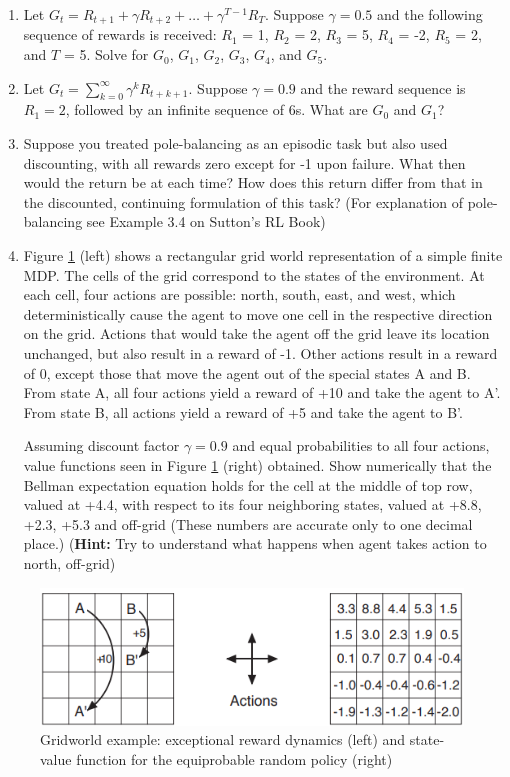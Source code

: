 \documentclass[11pt,onecolumn]{article}
\begin{document}
\begin{enumerate}
    \item Let $G_t = R_{t+1} + \gamma R_{t+2} + \ldots + \gamma^{T-1} R_{T}$. Suppose $\gamma = 0.5$ and the following sequence of rewards is received: $R_1$ = 1, $R_2$ = 2, $R_3$ = 5, $R_4$ = -2, $R_5$ = 2, and $T$ = 5. Solve for $G_0$, $G_1$, $G_2$, $G_3$, $G_4$, and $G_5$.
    
    \item Let $G_t = \sum_{k=0}^\infty \gamma^k R_{t+k+1}$. Suppose $\gamma = 0.9$ and the reward sequence is $R_1 =2$, followed by an infinite sequence of 6s. What are $G_0$ and $G_1$?
    
    \item Suppose you treated pole-balancing as an episodic task but also used discounting, with all rewards zero except for -1 upon failure. What then would the return be at each time? How does this return differ from that in the discounted, continuing formulation of this task? (For explanation of pole-balancing see Example 3.4 on Sutton's RL Book)
    
    \item Figure \ref{fig:book3.14} (left) shows a rectangular grid world representation of a simple finite MDP. The cells of the grid correspond to the states of the environment. At each cell, four actions are possible: north, south, east, and west, which deterministically cause the agent to move one cell in the respective direction on the grid. Actions that would take the agent off the grid leave its location unchanged, but also result in a reward of -1. Other actions result in a reward of 0, except those that move the agent out of the special states A and B. From state A, all four actions yield a reward of +10 and take the agent to A'. From state B, all actions yield a reward of +5 and take the agent to B'. 
    
    Assuming discount factor $\gamma=0.9$ and equal probabilities to all four actions, value functions seen in Figure \ref{fig:book3.14} (right) obtained. Show numerically that the Bellman expectation equation holds for the cell at the middle of top row, valued at +4.4, with respect to its four neighboring states, valued at +8.8, +2.3, +5.3 and off-grid (These numbers are accurate only to one decimal place.) (\textbf{Hint:} Try to understand what happens when agent takes action to north, off-grid)
    
\end{enumerate}

\begin{figure}[htbp]
    \centering
    \includegraphics[width=0.6\linewidth]{figures/mdp_grid.png}
    
    \caption{Gridworld example: exceptional reward dynamics (left) and state-value function for the equiprobable random policy (right)}
    \label{fig:book3.14}
\end{figure}
\end{document}
